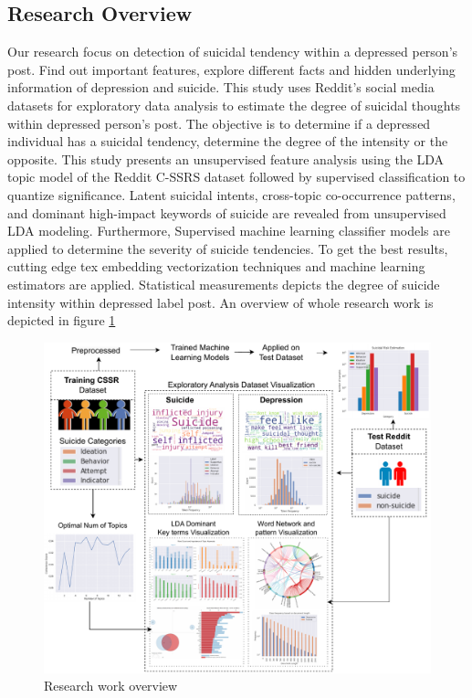 \documentclass[sn-mathphys,Numbered]{sn-jnl}%
\theoremstyle{thmstyleone}%
\theoremstyle{thmstyletwo}%
\theoremstyle{thmstylethree}%
\begin{document}
\subsection{Research Overview}\label{overview}
Our research focus on detection of suicidal tendency within a depressed person’s post. Find out important features, explore different facts and hidden underlying information of depression and suicide. This study uses Reddit's social media datasets for exploratory data analysis to estimate the degree of suicidal thoughts within depressed person's post. The objective is to determine if a depressed individual has a suicidal tendency, determine the degree of the intensity or the opposite. This study presents an unsupervised feature analysis using the LDA topic model of the Reddit C-SSRS dataset followed by supervised classification to quantize significance. Latent suicidal intents, cross-topic co-occurrence patterns, and dominant high-impact keywords of suicide are revealed from unsupervised LDA modeling. Furthermore, Supervised machine learning classifier models are applied to determine the severity of suicide tendencies. To get the best results, cutting edge tex embedding vectorization techniques and machine learning estimators are applied. Statistical measurements depicts the degree of suicide intensity within depressed label post. An overview of whole research work is depicted in figure \ref{whole_diagram}
\begin{figure}[h!]
\centering
\includegraphics[width=\textwidth]{diagram_relation.pdf}
\caption{Research work overview}
\label{whole_diagram}
\end{figure}
\end{document}
